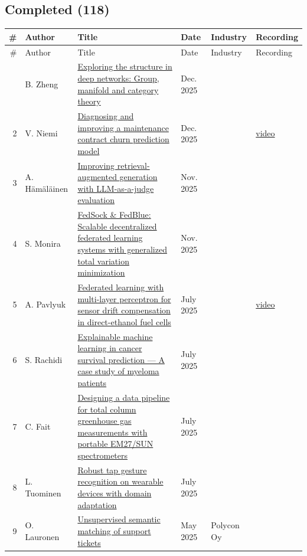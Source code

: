 \documentclass[11pt,a4paper]{article}
\begin{document}
\subsection*{Completed (118)}

\begin{longtable}{@{}r p{2.8cm} p{6.3cm} p{1.6cm} p{2cm} p{1.8cm}@{}}
\toprule
\# & Author & Title & Date & Industry & Recording \\
\midrule
\endfirsthead
\toprule
\# & Author & Title & Date & Industry & Recording \\
\midrule
\endhead
\bottomrule
\endfoot
1 & B. Zheng & \href{https://urn.fi/URN:NBN:fi:aalto-202601221854}{Exploring the structure in deep networks: Group, manifold and category theory} & Dec. 2025 &  &  \\
2 & V. Niemi & \href{https://urn.fi/URN:NBN:fi:aalto-202601221885}{Diagnosing and improving a maintenance contract churn prediction model} & Dec. 2025 &  & \href{https://youtu.be/XIjMrt__kas}{video} \\
3 & A. Hämäläinen & \href{https://urn.fi/URN:NBN:fi:aalto-202512179401}{Improving retrieval-augmented generation with LLM-as-a-judge evaluation} & Nov. 2025 &  &  \\
4 & S. Monira & \href{https://urn.fi/URN:NBN:fi:aalto-202512169317}{FedSock \& FedBlue: Scalable decentralized federated learning systems with generalized total variation minimization} & Nov. 2025 &  &  \\
5 & A. Pavlyuk & \href{https://aaltodoc.aalto.fi/items/4a5a94c3-5302-44a8-b7c7-b3cdb9cbece8}{Federated learning with multi-layer perceptron for sensor drift compensation in direct-ethanol fuel cells} & July 2025 &  & \href{https://youtu.be/WdRNTwxm1g8}{video} \\
6 & S. Rachidi & \href{https://urn.fi/URN:NBN:fi:aalto-202508186254}{Explainable machine learning in cancer survival prediction — A case study of myeloma patients} & July 2025 &  &  \\
7 & C. Fait & \href{https://urn.fi/URN:NBN:fi:aalto-202508186244}{Designing a data pipeline for total column greenhouse gas measurements with portable EM27/SUN spectrometers} & July 2025 &  &  \\
8 & L. Tuominen & \href{https://urn.fi/URN:NBN:fi:aalto-202508206651}{Robust tap gesture recognition on wearable devices with domain adaptation} & July 2025 &  &  \\
9 & O. Lauronen & \href{https://urn.fi/URN:NBN:fi:aalto-202506174861}{Unsupervised semantic matching of support tickets} & May 2025 & Polycon Oy &  \\

\end{longtable}
\end{document}
